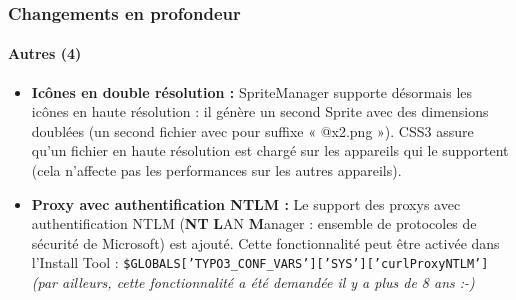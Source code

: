 \begin{frame}[fragile]
	\frametitle{Changements en profondeur}
	\framesubtitle{Autres (4)}

	\begin{itemize}

		\item \textbf{Icônes en double résolution :}\newline
			\small
				SpriteManager supporte désormais les icônes en haute résolution : il génère un second \textsf{Sprite} avec des dimensions doublées (un second fichier avec pour suffixe « @x2.png »). CSS3 assure qu'un fichier en haute résolution est chargé sur les appareils qui le supportent\newline
				(cela n'affecte pas les performances sur les autres appareils).
			\normalsize

		\item \textbf{Proxy avec authentification NTLM :}\newline
			\small
				Le support des proxys avec authentification NTLM (\textbf{NT} \textbf{L}AN \textbf{M}anager : ensemble de protocoles de sécurité de Microsoft) est ajouté. Cette fonctionnalité peut être activée dans l'Install Tool :\newline
			\normalsize			
				\texttt{\$GLOBALS['TYPO3\_CONF\_VARS']['SYS']['curlProxyNTLM']}\newline
				\emph{(par ailleurs, cette fonctionnalité a été demandée il y a plus de 8 ans :-)}
			\normalsize

	\end{itemize}
	
\end{frame}



